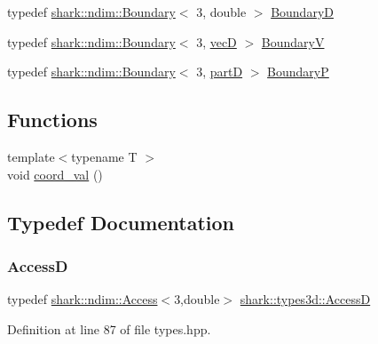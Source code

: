\begin{DoxyCompactItemize}
\item 
typedef \hyperlink{classshark_1_1ndim_1_1_boundary}{shark\+::ndim\+::\+Boundary}$<$ 3, double $>$ \hyperlink{namespaceshark_1_1types3d_afe32c5ed11d5f0a5e20fef2f7f9489d2}{BoundaryD}
\item 
typedef \hyperlink{classshark_1_1ndim_1_1_boundary}{shark\+::ndim\+::\+Boundary}$<$ 3, \hyperlink{namespaceshark_1_1types3d_a2ad4ea08e8e6d62a99ffef91988c717c}{vecD} $>$ \hyperlink{namespaceshark_1_1types3d_a284fcada5e9b661f5c06a1ebbe013dc4}{BoundaryV}
\item 
typedef \hyperlink{classshark_1_1ndim_1_1_boundary}{shark\+::ndim\+::\+Boundary}$<$ 3, \hyperlink{namespaceshark_1_1types3d_a8ba1ca83346f7674ce78342d0dc516ce}{partD} $>$ \hyperlink{namespaceshark_1_1types3d_a1a7624113c85fce0b5558f4398b88171}{BoundaryP}
\end{DoxyCompactItemize}
\subsection*{Functions}
\begin{DoxyCompactItemize}
\item 
{\footnotesize template$<$typename T $>$ }\\void \hyperlink{namespaceshark_1_1types3d_a7cc03a0b9b11f9e1326d02e6d849da28}{coord\+\_\+val} ()
\end{DoxyCompactItemize}


\subsection{Typedef Documentation}
\hypertarget{namespaceshark_1_1types3d_a795ec6a520ff1e94b450e6c49306c121}{}\label{namespaceshark_1_1types3d_a795ec6a520ff1e94b450e6c49306c121} 
\subsubsection{\texorpdfstring{AccessD}{AccessD}}
{\footnotesize\ttfamily typedef \hyperlink{classshark_1_1ndim_1_1_access}{shark\+::ndim\+::\+Access}$<$3,double$>$ \hyperlink{namespaceshark_1_1types3d_a795ec6a520ff1e94b450e6c49306c121}{shark\+::types3d\+::\+AccessD}}



Definition at line 87 of file types.\+hpp.

\hypertarget{namespaceshark_1_1types3d_a3c9bf12e0ef0af2d09be323b967710fe}{}\label{namespaceshark_1_1types3d_a3c9bf12e0ef0af2d09be323b967710fe} 
